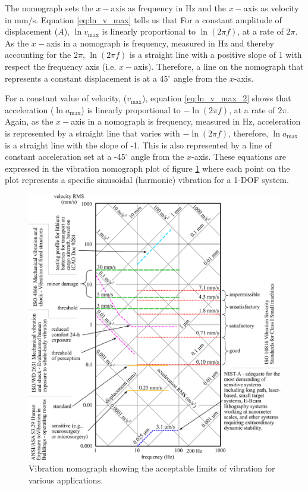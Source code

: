 \documentclass[12pt,letter]{article}
\numberwithin{ex}{section} %
\numberwithin{re}{section} %
\begin{document}
The nomograph sets the $x-$axis as frequency in Hz and the $x-$axis as velocity in mm/s. Equation \ref{eq:ln_v_max} tells us that For a constant amplitude of displacement ($A$), $\ln v_\text{max}$ is linearly proportional to $\ln (2 \pi f)$, at a rate of $2 \pi$. As the $x-$axis in a nomograph is frequency, measured in Hz and thereby accounting for the $2 \pi$, $\ln (2 \pi f)$ is a straight line with a positive slope of 1 with respect the frequency axis (i.e. $x-$axis). Therefore, a line on the nomograph that represents a constant displacement is at a 45$^\circ$ angle from the $x$-axis. 


For a constant value of velocity, ($v_\text{max}$), equation \ref{eq:ln_v_max_2} shows that acceleration ($\ln a_\text{max}$) is linearly proportional to $-\ln (2 \pi f)$, at a rate of $2 \pi$. Again, as the $x-$axis in a nomograph is frequency, measured in Hz, acceleration is represented by a straight line that varies with $- \ln(2\pi f)$, therefore, $\ln a_\text{max}$ is a straight line with the slope of -1. This is also represented by a line of constant acceleration set at a -45$^\circ$ angle from the $x$-axis. These equations are expressed in the vibration nomograph plot of figure \ref{fig:Vibration_nomograph} where each point on the plot represents a specific sinusoidal (harmonic) vibration for a 1-DOF system.  

\begin{figure}[H]
    \centering
    \includegraphics[width=4.5in]{../Figures/Vibration_nomograph.png}
    \caption{Vibration nomograph showing the acceptable limits of vibration for various applications.}
    \label{fig:Vibration_nomograph}
\end{figure}
\end{document}
